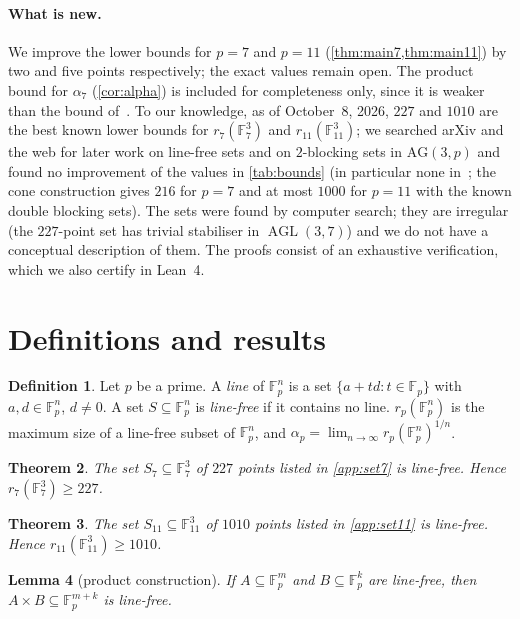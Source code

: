 \documentclass[11pt]{article}
\numberwithin{equation}{section}
\newtheorem{theorem}{Theorem}[section]
\newtheorem{lemma}[theorem]{Lemma}
\theoremstyle{definition}
\newtheorem{definition}[theorem]{Definition}
\theoremstyle{remark}
\newcommand{\F}{\mathbb F}
\DeclareMathOperator{\AGL}{AGL}
\begin{document}
\paragraph{What is new.} We improve the lower bounds for $p=7$ and $p=11$
(\cref{thm:main7,thm:main11}) by two and five points respectively; the exact values remain open.
The product bound for $\alpha_7$ (\cref{cor:alpha}) is included for completeness only, since it
is weaker than the bound of~\cite{FuhrerTaranchuk}. To our knowledge, as of October~8, 2026,
$227$ and $1010$ are the best known lower bounds for $r_7(\F_7^3)$ and $r_{11}(\F_{11}^3)$; we
searched arXiv and the web for later work on line-free sets and on $2$-blocking sets in
$\mathrm{AG}(3,p)$ and found no improvement of the values in \cref{tab:bounds} (in particular
none in~\cite{Kovacs,FuhrerTaranchuk}; the cone construction gives $216$ for $p=7$ and at most
$1000$ for $p=11$ with the known double blocking sets). The sets were found by computer search; they are
irregular (the $227$-point set has trivial stabiliser in $\AGL(3,7)$) and we do not have a
conceptual description of them. The proofs consist of an exhaustive verification, which we
also certify in Lean~4.

\section{Definitions and results}

\begin{definition}
Let $p$ be a prime. A \emph{line} of $\F_p^n$ is a set $\{a+td: t\in\F_p\}$ with
$a,d\in\F_p^n$, $d\neq0$. A set $S\subseteq\F_p^n$ is \emph{line-free} if it contains no line.
$r_p(\F_p^n)$ is the maximum size of a line-free subset of $\F_p^n$, and
$\alpha_p=\lim_{n\to\infty}r_p(\F_p^n)^{1/n}$.
\end{definition}

\begin{theorem}\label{thm:main7}
The set $S_7\subseteq\F_7^3$ of $227$ points listed in \cref{app:set7} is line-free. Hence
$r_7(\F_7^3)\ge227$.
\end{theorem}

\begin{theorem}\label{thm:main11}
The set $S_{11}\subseteq\F_{11}^3$ of $1010$ points listed in \cref{app:set11} is line-free.
Hence $r_{11}(\F_{11}^3)\ge1010$.
\end{theorem}

\begin{lemma}[product construction]\label{lem:product}
If $A\subseteq\F_p^m$ and $B\subseteq\F_p^k$ are line-free, then
$A\times B\subseteq\F_p^{m+k}$ is line-free.
\end{lemma}
\end{document}
